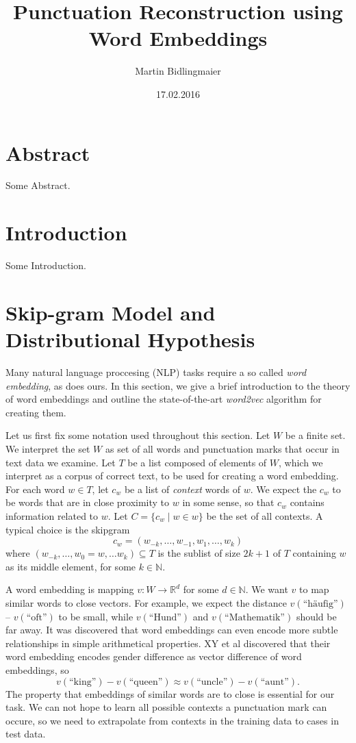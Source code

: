 \documentclass{amsart}
\theoremstyle{plain}
\theoremstyle{definition}
\newcommand{\R}{\mathbb{R}}
\newcommand{\N}{\mathbb{N}}
\begin{document}
\title{Punctuation Reconstruction using Word Embeddings}
\author{Martin Bidlingmaier}
\date{17.02.2016}
\maketitle

\section{Abstract}
  Some Abstract.

\section{Introduction}
  Some Introduction.

\section{Skip-gram Model and Distributional Hypothesis}
  Many natural language proccesing (NLP) tasks require a so called \emph{word embedding}, as does ours.
  In this section, we give a brief introduction to the theory of word embeddings and outline the state-of-the-art \emph{word2vec} algorithm for creating them.

  Let us first fix some notation used throughout this section.
  Let $W$ be a finite set.
  We interpret the set $W$ as set of all words and punctuation marks that occur in text data we examine.
  Let $T$ be a list composed of elements of $W$, which we interpret as a corpus of correct text, to be used for creating a word embedding.
  For each word $w \in T$, let $c_w$ be a list of \emph{context} words of $w$.
  We expect the $c_w$ to be words that are in close proximity to $w$ in some sense, so that $c_w$ contains information related to $w$.
  Let $C = \{c_w \mid w \in w\}$ be the set of all contexts.
  A typical choice is the skipgram
  \begin{equation*}
    c_w = (w_{-k}, \dots, w_{-1}, w_1, \dots, w_k)
  \end{equation*}
  where $(w_{-k}, \dots, w_0 = w, \dots w_k) \subseteq T$ is the sublist of size $2 k + 1$ of $T$ containing $w$ as its middle element, for some $k \in \N$.
  
  A word embedding is mapping $v : W \rightarrow \R^d$ for some $d \in \N$.
  We want $v$ to map similar words to close vectors.
  For example, we expect the distance $v(\text{``häufig''})$ -- $v(\text{``oft''})$ to be small, while $v(\text{``Hund''})$ and $v(\text{``Mathematik''})$ should be far away.
  It was discovered that word embeddings can even encode more subtle relationships in simple arithmetical properties.
  XY et al discovered that their word embedding encodes gender difference as vector difference of word embeddings, so
  \begin{equation*}
    v(\text{``king''}) - v(\text{``queen''}) \approx v(\text{``uncle''}) - v(\text{``aunt''}).
  \end{equation*}
  The property that embeddings of similar words are to close is essential for our task.
  We can not hope to learn all possible contexts a punctuation mark can occure, so we need to extrapolate from contexts in the training data to cases in test data.
\end{document}
